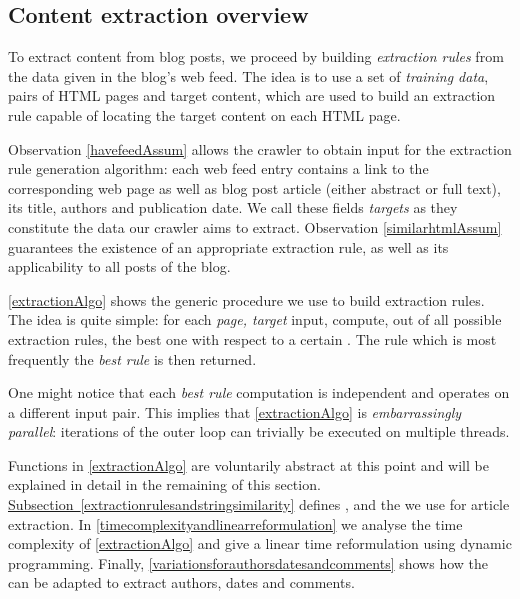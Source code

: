 \subsection{Content extraction overview}
\label{contentextraction}

To extract content from blog posts, we proceed by building \emph{extraction rules} from the data given in the blog's web feed. The idea is to use a set of \emph{training data}, pairs of HTML pages and target content, which are used to build an extraction rule capable of locating the target content on each HTML page.

Observation \ref{havefeedAssum} allows the crawler to obtain input for the extraction rule generation algorithm: each web feed entry contains a link to the corresponding web page as well as blog post article (either abstract or full text), its title, authors and publication date. We call these fields \emph{targets} as they constitute the data our crawler aims to extract. Observation \ref{similarhtmlAssum} guarantees the existence of an appropriate extraction rule, as well as its applicability to all posts of the blog.

\autoref{extractionAlgo} shows the generic procedure we use to build extraction rules. The idea is quite simple: for each \code{(}\emph{page, target}\code{)} input, compute, out of all possible extraction rules, the best one with respect to a certain . The rule which is most frequently the \emph{best rule} is then returned.

\extractionAlgo

One might notice that each \emph{best rule} computation is independent and operates on a different input pair. This implies that \autoref{extractionAlgo} is \emph{embarrassingly parallel}: iterations of the outer loop can trivially be executed on multiple threads.

Functions in \autoref{extractionAlgo} are voluntarily abstract at this point and will be explained in detail in the remaining of this section.
\hyperref[extractionrulesandstringsimilarity]{Subsection~\ref*{extractionrulesandstringsimilarity}} %
defines ,  and the  we use for article extraction. In \autoref{timecomplexityandlinearreformulation} we analyse the time complexity of \autoref{extractionAlgo} and give a linear time reformulation using dynamic programming. Finally, \autoref{variationsforauthorsdatesandcomments} shows how the  can be adapted to extract authors, dates and comments.

